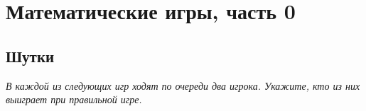 

\section*{Математические игры, часть 0}



\subsection*{Шутки}

\emph{%
В каждой из следующих игр ходят по очереди два игрока.
Укажите, кто из них выиграет при правильной игре.}


